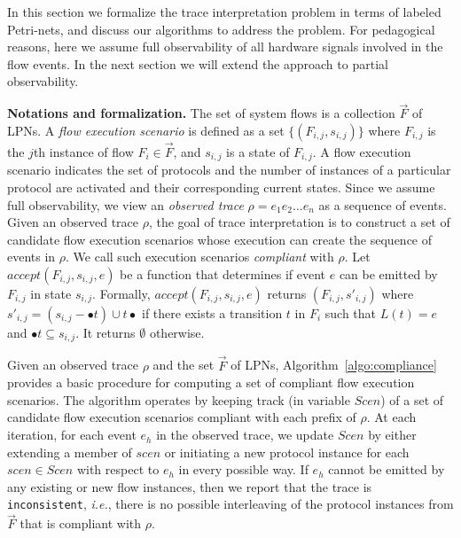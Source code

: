 \documentclass[conference]{IEEEtran}
\newcommand{\ie}{\mbox{{\em i.e.}}}
\begin{document}
In this section we formalize the trace interpretation
problem in terms of labeled Petri-nets, and discuss our
algorithms to address the problem.  For pedagogical reasons,
here we assume full observability of all hardware signals
involved in the flow events.  In the next section we will
extend the approach to partial observability.

\medskip

\noindent 
{\bf Notations and formalization.}  The set
of system flows is a collection ${\vec{F}}$ of
LPNs.  A {\em flow execution scenario} is defined as a
set $\{(F_{i,j}, s_{i,j})\}$ where $F_{i,j}$ is the
$j$th instance of flow $F_i \in {\vec{F}}$, and $s_{i,j}$ is
a state of $F_{i,j}$.  A flow execution scenario indicates
the set of protocols and the number of instances of a
particular protocol are activated and their corresponding
current states.  Since we assume full observability, we view
an {\em observed trace} $\rho = e_1e_2\ldots e_n$ as a
sequence of events.  Given an observed trace $\rho$, the
goal of trace interpretation is to construct a set of
candidate flow execution scenarios whose execution can
create the sequence of events in $\rho$.  We call such
execution scenarios {\em compliant} with $\rho$.  Let
$\mathit{accept(F_{i,j}, s_{i,j}, e)}$ be a function that
determines if event $e$ can be emitted by $F_{i,j}$ in state
$s_{i,j}$.  Formally, $\mathit{accept(F_{i,j}, s_{i,j}, e)}$
returns $(F_{i,j}, s'_{i,j})$ where $s'_{i,j} = (s_{i,j} - \bullet t)
\cup t\bullet$ if there exists a transition
$t$ in $F_i$ such that $L(t) = e$ and $\bullet t \subseteq
s_{i,j}$.  It returns $\emptyset$ otherwise.


Given an observed trace $\rho$ and the set $\vec{F}$ of LPNs,
Algorithm~\ref{algo:compliance} provides a basic procedure for
computing a set of compliant flow execution scenarios. 
The algorithm operates by keeping track (in variable
$\mathit{Scen}$) of a set of candidate flow execution scenarios
compliant with each prefix of $\rho$.  At each iteration,
for each event $e_h$ in the observed trace, we
update $Scen$ by either extending a member of
$\mathit{scen}$ or initiating a new protocol instance for 
each $scen \in Scen$ with respect to $e_h$ in every possible way.
If $e_h$ cannot be emitted by any existing or new flow instances, 
then we report that the trace is {\tt  inconsistent}, \ie, 
there is no possible interleaving of
the protocol instances from $\vec{F}$ that is compliant with
$\rho$.
\end{document}
